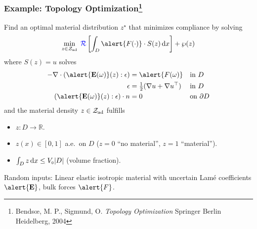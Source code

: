 \documentclass[aspectratio=169,xcolor=dvipsnames,11pt]{beamer}
\newcommand{\Zad}{\mathcal{Z}_{\text{\textup{ad}}}}
\newcommand{\risk}{\mathcal{R}}
\begin{document}
\begin{footnotesize}
\begin{frame}\frametitle{Example: Topology Optimization\footnote{\tiny Bends\oe, M. P., Sigmund, O. \textit{Topology Optimization} Springer Berlin Heidelberg, 2004}}

\begin{block}{}
Find an optimal material distribution $z^{\star}$ that minimizes compliance by solving
      \[
      \min_{z \in \Zad}\;
         {\color{blue}\risk}\left[
            \int_D \alert{F(\cdot)}\cdot S(z)\,\mathrm{d}x\right] + \wp(z)
      \]
      where $S(z)=u$ solves \vspace{-1ex}
      \begin{align*}
        -\nabla\cdot(\alert{\mathbf{E}(\omega)}(z):\epsilon )
            =&\; \alert{F(\omega)} &&\text{in }D\textcolor{white}{.} \\
        \epsilon  =&\;
           \tfrac{1}{2}(\nabla u + \nabla u^\top)
           &&\text{in }D\textcolor{white}{.}\\
        (\alert{\mathbf{E}(\omega)}(z):\epsilon ) \cdot n =&\; 0 &&\text{on }\partial D
      \end{align*}
and the material density $z \in \Zad$ fulfills 
\begin{itemize}
\item $z : D \to \mathbb R$.
\item $z(x) \in [0,1]$ a.e.\ on $D$ ($z = 0$ ``no material'', $z = 1$ ``material'').
\item  $\int_D z\,\mathrm{d}x \le V_{\textup{\tiny 0}}|D|$ (volume fraction).
\end{itemize}
 
Random inputs: Linear elastic isotropic material with \alert{uncertain}
Lam\'e coefficients $\alert{\mathbf{E}}$, bulk forces $\alert{F}$.

\end{block}
\end{frame}


\end{footnotesize}
\end{document}
